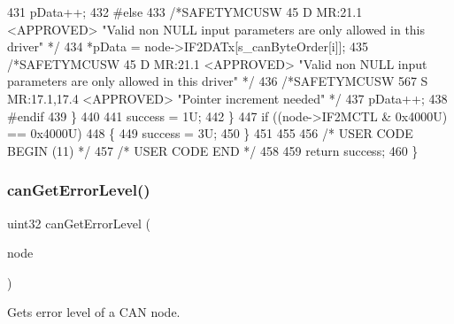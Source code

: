 \begin{DoxyCode}
431             pData++;
432 \textcolor{preprocessor}{#else
}
433             \textcolor{comment}{/*SAFETYMCUSW 45 D MR:21.1 <APPROVED> "Valid non NULL input parameters are only allowed in this
       driver" */}
434             *pData = node->IF2DATx[s\_canByteOrder[i]];
435             \textcolor{comment}{/*SAFETYMCUSW 45 D MR:21.1 <APPROVED> "Valid non NULL input parameters are only allowed in this
       driver" */}
436             \textcolor{comment}{/*SAFETYMCUSW 567 S MR:17.1,17.4 <APPROVED> "Pointer increment needed" */}
437             pData++;
438 \textcolor{preprocessor}{#endif
}
439         \}
440 
441         success = 1U;
442     \}
447     \textcolor{keywordflow}{if} ((node->IF2MCTL & 0x4000U) == 0x4000U)
448     \{
449         success = 3U;
450     \}
451 
455 
456 \textcolor{comment}{/* USER CODE BEGIN (11) */}
457 \textcolor{comment}{/* USER CODE END */}
458 
459     \textcolor{keywordflow}{return} success;
460 \}
\end{DoxyCode}
\mbox{\label{group__CAN_gaf4802fe6abe62c1ca43e118438dd48c3}} 
\subsubsection{\texorpdfstring{can\+Get\+Error\+Level()}{canGetErrorLevel()}}
{\footnotesize\ttfamily uint32 can\+Get\+Error\+Level (\begin{DoxyParamCaption}\item[{\mbox{\hyperlink{reg__can_8h_a54ace0879c28a425474845a63d662c05}{can\+B\+A\+S\+E\+\_\+t}} $\ast$}]{node }\end{DoxyParamCaption})}



Gets error level of a C\+AN node. 


